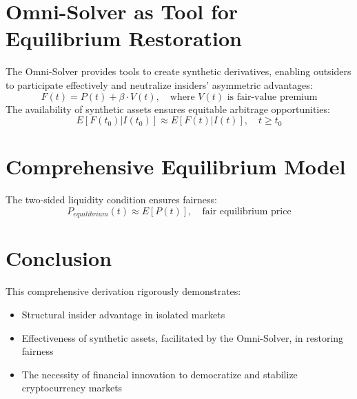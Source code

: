 \documentclass{article}
\begin{document}
\section{Omni-Solver as Tool for Equilibrium Restoration}

The Omni-Solver provides tools to create synthetic derivatives, enabling outsiders to participate effectively and neutralize insiders' asymmetric advantages:
\[
F(t) = P(t) + \beta \cdot V(t), \quad \text{where } V(t) \text{ is fair-value premium}
\]
The availability of synthetic assets ensures equitable arbitrage opportunities:
\[
E[F(t_0)|I(t_0)] \approx E[F(t)|I(t)], \quad t \ge t_0
\]

\section{Comprehensive Equilibrium Model}

The two-sided liquidity condition ensures fairness:
\[
P_{equilibrium}(t) \approx E[P(t)], \quad \text{fair equilibrium price}
\]

\section{Conclusion}

This comprehensive derivation rigorously demonstrates:
\begin{itemize}
    \item Structural insider advantage in isolated markets
    \item Effectiveness of synthetic assets, facilitated by the Omni-Solver, in restoring fairness
    \item The necessity of financial innovation to democratize and stabilize cryptocurrency markets
\end{itemize}
\end{document}

